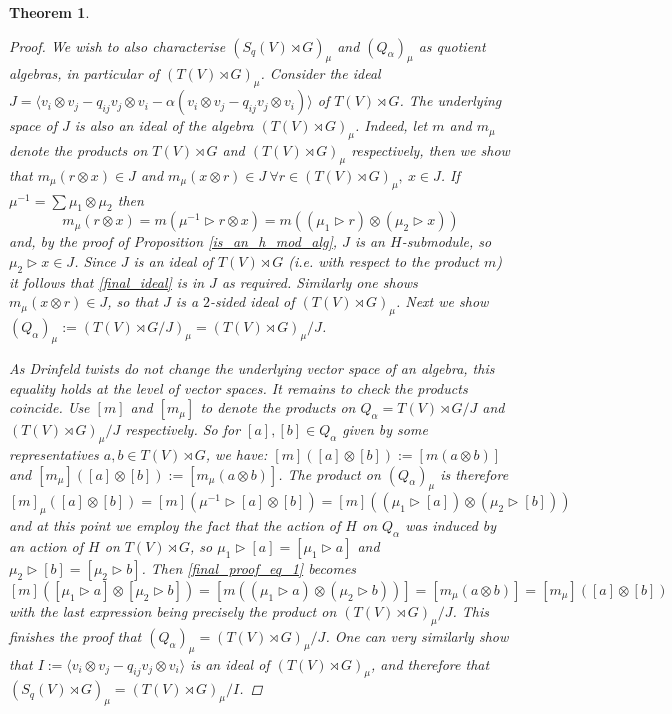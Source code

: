 \documentclass[10pt]{article}
\newcommand{\bb}{\medbreak}
\newcommand{\nt}{\noindent}
\newtheorem{theorem}[lemma]{Theorem}
\theoremstyle{definition}
\begin{document}
\begin{theorem}
\begin{proof}
\nt We wish to also characterise $(S_q(V)\rtimes G)_\mu$ and $(Q_\alpha)_\mu$ as quotient algebras, in particular of $(T(V)\rtimes G)_\mu$. Consider the ideal $J=\langle v_i\otimes v_j-q_{ij}v_j\otimes v_i-\alpha(v_i\otimes v_j-q_{ij}v_j\otimes v_i)\rangle$ of $T(V)\rtimes G$. The underlying space of $J$ is also an ideal of the algebra $(T(V)\rtimes G)_\mu$. Indeed, let $m$ and $m_\mu$ denote the products on $T(V)\rtimes G$ and $(T(V)\rtimes G)_\mu$ respectively, then we show that $m_\mu(r\otimes x)\in J$ and $m_\mu(x\otimes r)\in J\ \forall r\in (T(V)\rtimes G)_\mu,\ x\in J$. If $\mu^{-1}=\sum \mu_1\otimes \mu_2$ then 
\begin{equation}\label{final_ideal}
m_\mu(r\otimes x) =m(\mu^{-1}\rhd r\otimes x)=m((\mu_1\rhd r)\otimes (\mu_2\rhd x))
\end{equation}
and, by the proof of Proposition \ref{is_an_h_mod_alg}, $J$ is an $H$-submodule, so $\mu_2\rhd x\in J$. Since $J$ is an ideal of $T(V)\rtimes G$ (i.e. with respect to the product $m$) it follows that \eqref{final_ideal} is in $J$ as required. Similarly one shows $m_\mu(x\otimes r)\in J$,  so that $J$ is a $2$-sided ideal of $(T(V)\rtimes G)_\mu$. Next we show $(Q_\alpha)_\mu:=(T(V)\rtimes G/J)_\mu=(T(V)\rtimes G)_\mu/J$.\bb 

\nt As Drinfeld twists do not change the underlying vector space of an algebra, this equality holds at the level of vector spaces. It remains to check the products coincide. Use $[m]$ and $[m_\mu]$ to denote the products on $Q_\alpha=T(V)\rtimes G/J$ and $(T(V)\rtimes G)_\mu/J$ respectively. So for $[a],[b]\in Q_\alpha$ given by some representatives $a,b\in T(V)\rtimes G$, we have: $[m]([a]\otimes [b]):=[m(a\otimes b)]$ and $[m_\mu]([a]\otimes [b]):=[m_\mu(a\otimes b)]$. The product on $(Q_\alpha)_\mu$ is therefore 
\begin{equation}\label{final_proof_eq_1}
[m]_\mu([a]\otimes [b])=[m](\mu^{-1}\rhd [a]\otimes [b])= [m]((\mu_1\rhd [a])\otimes (\mu_2\rhd [b]))
\end{equation}
and at this point we employ the fact that the action of $H$ on $Q_\alpha$ was induced by an action of $H$ on $T(V)\rtimes G$, so $\mu_1\rhd [a]=[\mu_1\rhd a]$ and $\mu_2\rhd [b]=[\mu_2\rhd b]$. Then \eqref{final_proof_eq_1} becomes 
$$[m]([\mu_1\rhd a]\otimes [\mu_2\rhd b])=[m((\mu_1\rhd a)\otimes (\mu_2\rhd b))]=[m_\mu(a\otimes b)]=[m_\mu]([a]\otimes [b])$$
with the last expression being precisely the product on $(T(V)\rtimes G)_\mu/J$. This finishes the proof that $(Q_\alpha)_\mu=(T(V)\rtimes G)_\mu/J$. One can very similarly show that $I:=\langle v_i\otimes v_j-q_{ij}v_j\otimes v_i\rangle$ is an ideal of $(T(V)\rtimes G)_\mu$, and therefore that $(S_q(V)\rtimes G)_\mu=(T(V)\rtimes G)_\mu/I$.\bb


\end{proof}
\end{theorem}
\end{document}
